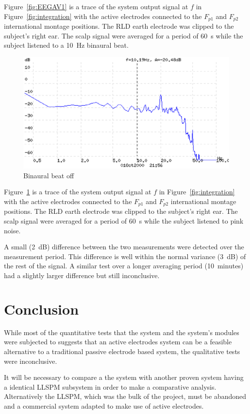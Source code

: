 Figure~\ref{fig:EEGAV1} is a trace of the system output signal at $f$
in Figure~\ref{fig:integration} with the active electrodes connected
to the $F_{p1}$ and $F_{p2}$ international montage positions. The RLD
earth electrode was clipped to the subject's right ear. The scalp
signal were averaged for a period of 60~s while the subject listened
to a 10~Hz binaural beat.

\begin{figure}[htbp]
\begin{center}
	\includegraphics[width=\textwidth]{EEGAV1.ps} 
	\caption{Binaural beat off}
    \label{fig:EEGAV2}
\end{center}
\end{figure}

Figure~\ref{fig:EEGAV2} is a trace of the system output signal at $f$
in Figure~\ref{fig:integration} with the active electrodes connected
to the $F_{p1}$ and $F_{p2}$ international montage positions. The RLD
earth electrode was clipped to the subject's right ear. The scalp
signal were averaged for a period of 60~s while the subject listened
to pink noise.

A small (2~dB) difference between the two measurements were detected
over the measurement period. This difference is well within the normal
variance (3~dB) of the rest of the signal. A similar test over a
longer averaging period (10~minutes) had a slightly larger difference
but still inconclusive.

\section{Conclusion}

While most of the quantitative tests that the system and the system's
modules were subjected to suggests that an active electrodes system can
be a feasible alternative to a traditional passive electrode based
system, the qualitative tests were inconclusive.

It will be necessary to compare a the system with another proven
system having a identical LLSPM subsystem in order to make a
comparative analysis. Alternatively the LLSPM, which was the bulk of
the project, must be abandoned and a commercial system adapted to make
use of active electrodes.




